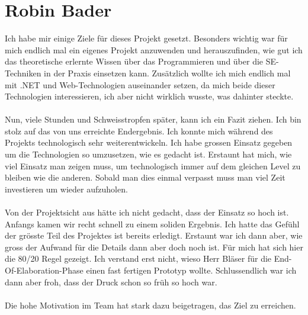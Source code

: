 	\section{Robin Bader}
	Ich habe mir einige Ziele für dieses Projekt gesetzt. Besonders wichtig war für mich endlich mal ein eigenes Projekt anzuwenden und herauszufinden, wie gut ich das theoretische erlernte Wissen über das Programmieren und über die SE-Techniken in der Praxis einsetzen kann. Zusätzlich wollte ich mich endlich mal mit .NET und Web-Technologien auseinander setzen, da mich beide dieser Technologien interessieren, ich aber nicht wirklich wusste, was dahinter steckte.\\ \\
Nun, viele Stunden und Schweisstropfen später, kann ich ein Fazit ziehen. Ich bin stolz auf das von uns erreichte Endergebnis. Ich konnte mich während des Projekts technologisch sehr weiterentwickeln. Ich habe grossen Einsatz gegeben um die Technologien so umzusetzen, wie es gedacht ist. Erstaunt hat mich, wie viel Einsatz man zeigen muss, um technologisch immer auf dem gleichen Level zu bleiben wie die anderen. Sobald man dies einmal verpasst muss man viel Zeit investieren um wieder aufzuholen.\\ \\
Von der Projektsicht aus hätte ich nicht gedacht, dass der Einsatz so hoch ist. Anfangs kamen wir recht schnell zu einem soliden Ergebnis. Ich hatte das Gefühl der grösste Teil des Projektes ist bereits erledigt. Erstaunt war ich dann aber, wie gross der Aufwand für die Details dann aber doch noch ist. Für mich hat sich hier die 80/20 Regel gezeigt. Ich verstand erst nicht, wieso Herr Bläser für die End-Of-Elaboration-Phase einen fast fertigen Prototyp wollte. Schlussendlich war ich dann aber froh, dass der Druck schon so früh so hoch war.\\ \\
Die hohe Motivation im Team hat stark dazu beigetragen, das Ziel zu erreichen.


